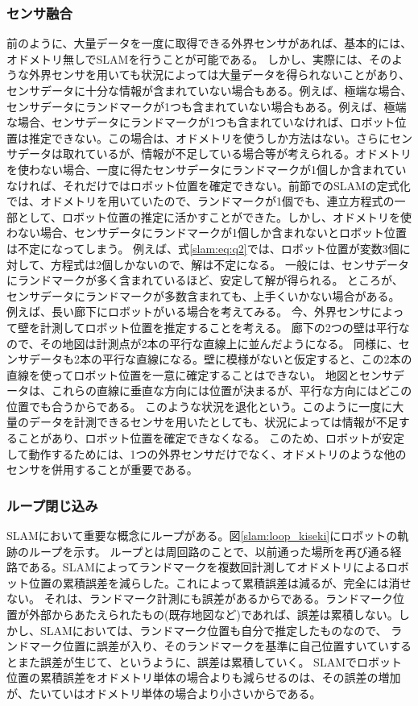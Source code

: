 \subsubsection{センサ融合}
前のように、大量データを一度に取得できる外界センサがあれば、基本的には、オドメトリ無しでSLAMを行うことが可能である。
しかし、実際には、そのような外界センサを用いても状況によっては大量データを得られないことがあり、センサデータに十分な情報が含まれていない場合もある。例えば、極端な場合、センサデータにランドマークが1つも含まれていない場合もある。例えば、極端な場合、センサデータにランドマークが1つも含まれていなければ、ロボット位置は推定できない。この場合は、オドメトリを使うしか方法はない。さらにセンサデータは取れているが、情報が不足している場合等が考えられる。オドメトリを使わない場合、一度に得たセンサデータにランドマークが1個しか含まれていなければ、それだけではロボット位置を確定できない。前節でのSLAMの定式化では、オドメトリを用いていたので、ランドマークが1個でも、連立方程式の一部として、ロボット位置の推定に活かすことができた。しかし、オドメトリを使わない場合、センサデータにランドマークが1個しか含まれないとロボット位置は不定になってしまう。
例えば、式\eqref{slam:eq:q2}では、ロボット位置が変数3個に対して、方程式は2個しかないので、解は不定になる。
一般には、センサデータにランドマークが多く含まれているほど、安定して解が得られる。
ところが、センサデータにランドマークが多数含まれても、上手くいかない場合がある。
例えば、長い廊下にロボットがいる場合を考えてみる。
今、外界センサによって壁を計測してロボット位置を推定することを考える。
廊下の2つの壁は平行なので、その地図は計測点が2本の平行な直線上に並んだようになる。
同様に、センサデータも2本の平行な直線になる。壁に模様がないと仮定すると、この2本の直線を使ってロボット位置を一意に確定することはできない。
地図とセンサデータは、これらの直線に垂直な方向には位置が決まるが、平行な方向にはどこの位置でも合うからである。
このような状況を退化という。このように一度に大量のデータを計測できるセンサを用いたとしても、状況によっては情報が不足することがあり、ロボット位置を確定できなくなる。
このため、ロボットが安定して動作するためには、1つの外界センサだけでなく、オドメトリのような他のセンサを併用することが重要である。

\subsubsection{ループ閉じ込み}
SLAMにおいて重要な概念にループがある。図\ref{slam:loop_kiseki}にロボットの軌跡のループを示す。
ループとは周回路のことで、以前通った場所を再び通る経路である。SLAMによってランドマークを複数回計測してオドメトリによるロボット位置の累積誤差を減らした。これによって累積誤差は減るが、完全には消せない。
それは、ランドマーク計測にも誤差があるからである。ランドマーク位置が外部からあたえられたもの(既存地図など)であれば、誤差は累積しない。しかし、SLAMにおいては、ランドマーク位置も自分で推定したものなので、
ランドマーク位置に誤差が入り、そのランドマークを基準に自己位置すいていするとまた誤差が生じて、というように、誤差は累積していく。
SLAMでロボット位置の累積誤差をオドメトリ単体の場合よりも減らせるのは、その誤差の増加が、たいていはオドメトリ単体の場合より小さいからである。

